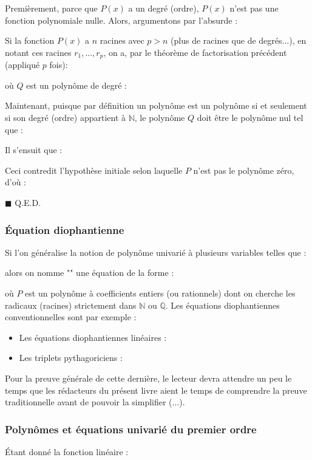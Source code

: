 	\begin{dem}
	Premièrement, parce que $P(x)$ a un degré (ordre), $P(x)$ n'est pas une fonction polynomiale nulle. Alors, argumentons par l'absurde :
	
	Si la fonction $P(x)$ a $n$ racines avec $p>n$ (plus de racines que de degrés...), en notant ces racines $r_1,...,r_p$, on a, par le théorème de factorisation précédent (appliqué $p$ fois):
	
	où $Q$ est un polynôme de degré :
	
	Maintenant, puisque par définition un polynôme est un polynôme si et seulement si son degré (ordre) appartient à $\mathbb{N}$, le polynôme $Q$ doit être le polynôme nul tel que :
	
	Il s'ensuit que :
	
	Ceci contredit l'hypothèse initiale selon laquelle $P$ n'est pas le polynôme zéro, d'où :
	
	\begin{flushright}
		$\blacksquare$  Q.E.D.
	\end{flushright}
	\end{dem}
	
	\subsubsection{Équation diophantienne}\label{diophantine equation}
	Si l'on généralise la notion de polynôme univarié à plusieurs variables telles que :
	
	alors on nomme "" une équation de la forme :
	
	où $P$ est un polynôme à coefficients entiers (ou rationnels) dont on cherche les radicaux (racines) strictement dans $\mathbb{N}$ ou $\mathbb{Q}$. Les équations diophantiennes conventionnelles sont par exemple :
	\begin{itemize}
		\item Les équations diophantiennes linéaires :
		
		
		\item Les triplets pythagoriciens :
			
	\end{itemize}
	Pour la preuve générale de cette dernière, le lecteur devra attendre un peu le temps que les rédacteurs du présent livre aient le temps de comprendre la preuve traditionnelle avant de pouvoir la simplifier (...).
	
	\subsubsection{Polynômes et équations univarié du premier ordre}
	Étant donné la fonction linéaire :
	
